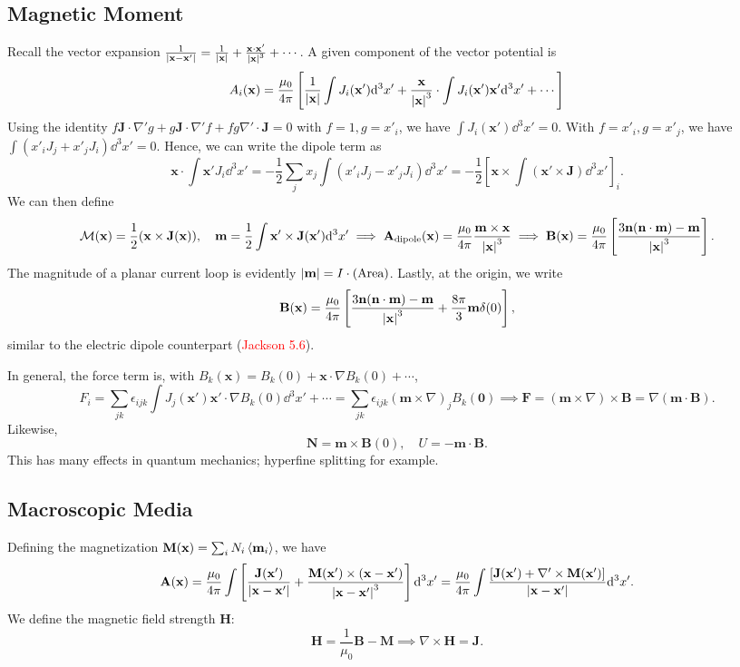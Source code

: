 \documentclass{article}
\begin{document}
\subsection{Magnetic Moment}
Recall the vector expansion $\frac 1{\left\lvert\mathbf x-\mathbf x'\right\rvert}=\frac 1{\left\lvert\mathbf x\right\rvert}+\frac{\mathbf x\cdot\mathbf x'}{\left\lvert\mathbf x\right\rvert^3}+\cdots$. A given component of the vector potential is 
$$A_i(\mathbf x)=\frac{\mu_0}{4\pi}\left[\frac 1{\left\lvert\mathbf x\right\rvert}\int J_i(\mathbf x')\dd^3x'+\frac{\mathbf x}{\left\lvert\mathbf x\right\rvert^3}\cdot\int J_i(\mathbf x')\mathbf x'\dd^3x'+\cdots\right]$$
Using the identity $f\mathbf J\cdot\nabla'g+g\mathbf J\cdot\nabla'f+fg\nabla'\cdot\mathbf J=0$ with $f=1,g=x'_i$, we have $\int J_i(\mathbf x')\dd^3x'=0$. With $f=x'_i,g=x'_j$, we have $\int(x'_iJ_j+x'_jJ_i)\dd^3x'=0.$ Hence, we can write the dipole term as 
$$\mathbf x\cdot\int\mathbf x'J_i\dd^3x'=-\frac 12\sum_jx_j\int(x'_iJ_j-x'_jJ_i)\dd^3x'=-\frac 12\left[\mathbf x\times\int(\mathbf x'\times\mathbf J)\dd^3x'\right]_i.$$
We can then define 
$$\mathcal M(\mathbf x)=\frac 12(\mathbf x\times\mathbf J(\mathbf x)),\quad\mathbf m=\frac 12\int\mathbf x'\times\mathbf J(\mathbf x')\dd^3x'\implies\mathbf A_\text{dipole}(\mathbf x)=\frac{\mu_0}{4\pi}\frac{\mathbf m\times\mathbf x}{\left\lvert\mathbf x\right\rvert^3}\implies\mathbf B(\mathbf x)=\frac{\mu_0}{4\pi}\left[\frac{3\mathbf n(\mathbf n\cdot\mathbf m)-\mathbf m}{\left\lvert\mathbf x\right\rvert^3}\right].$$
The magnitude of a planar current loop is evidently $\left\lvert\mathbf m\right\rvert=I\cdot(\text{Area})$. Lastly, at the origin, we write 
$$\mathbf B(\mathbf x)=\frac{\mu_0}{4\pi}\left[\frac{3\mathbf n(\mathbf n\cdot\mathbf m)-\mathbf m}{\left\lvert\mathbf x\right\rvert^3}+\frac{8\pi}3\mathbf m\delta(0)\right],$$
similar to the electric dipole counterpart (\textcolor{red}{Jackson 5.6}).

In general, the force term is, with $B_k(\mathbf x)=B_k(0)+\mathbf x\cdot\nabla B_k(0)+\cdots$, 
$$F_i=\sum_{jk}\epsilon_{ijk}\int J_j(\mathbf x')\mathbf x'\cdot\nabla B_k(0)\dd^3x'+\cdots=\sum_{jk}\epsilon_{ijk}(\mathbf m\times\nabla)_jB_k(\mathbf 0)\implies\mathbf F=(\mathbf m\times\nabla)\times\mathbf B=\nabla(\mathbf m\cdot\mathbf B).$$
Likewise, 
$$\mathbf N=\mathbf m\times\mathbf B(0),\quad U=-\mathbf m\cdot\mathbf B.$$
This has many effects in quantum mechanics; hyperfine splitting for example.

\subsection{Macroscopic Media}
Defining the magnetization $\mathbf M(\mathbf x)=\sum_iN_i\ev{\mathbf m_i}$, we have 
$$\mathbf A(\mathbf x)=\frac{\mu_0}{4\pi}\int\left[\frac{\mathbf J(\mathbf x')}{\left\lvert\mathbf x-\mathbf x'\right\rvert}+\frac{\mathbf M(\mathbf x')\times(\mathbf x-\mathbf x')}{\left\lvert\mathbf x-\mathbf x'\right\rvert^3}\right]\dd^3x'=\frac{\mu_0}{4\pi}\int\frac{[\mathbf J(\mathbf x')+\nabla'\times\mathbf M(\mathbf x')]}{\left\lvert\mathbf x-\mathbf x'\right\rvert}\dd^3x'.$$
We define the magnetic field strength $\mathbf H$:
$$\mathbf H=\frac 1{\mu_0}\mathbf B-\mathbf M\implies\nabla\times\mathbf H=\mathbf J.$$
\end{document}
